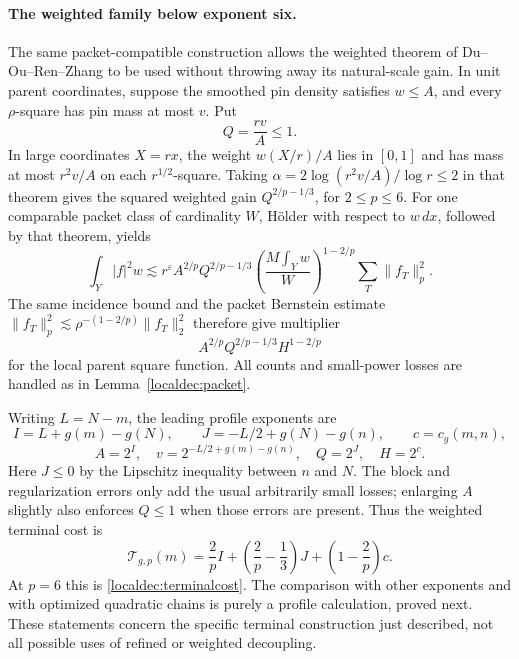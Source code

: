 \paragraph{The weighted family below exponent six.}
The same packet-compatible construction allows the weighted theorem of
Du--Ou--Ren--Zhang \cite[Theorem 1.1(b)]{dorz} to be used without
throwing away its natural-scale gain. In unit parent coordinates,
suppose the smoothed pin density satisfies \(w\le A\), and every
\(\rho\)-square has pin mass at most \(v\). Put
\[
 Q=\frac{rv}{A}\le1.
\]
In large coordinates \(X=rx\), the weight \(w(X/r)/A\) lies in
\([0,1]\) and has mass at most \(r^2v/A\) on each
\(r^{1/2}\)-square. Taking
\(\alpha=2\log(r^2v/A)/\log r\le2\) in that theorem gives the
squared weighted gain \(Q^{2/p-1/3}\), for \(2\le p\le6\).
For one comparable packet class of cardinality \(W\), H\"older with
respect to \(w\,dx\), followed by that theorem, yields
\[
 \int_Y|f|^2w
 \lesssim r^\varepsilon A^{2/p}Q^{2/p-1/3}
 \left(\frac{M\int_Yw}{W}\right)^{1-2/p}
 \sum_T\|f_T\|_p^2.
\]
The same incidence bound and the packet Bernstein estimate
\(\|f_T\|_p^2\lesssim\rho^{-(1-2/p)}\|f_T\|_2^2\)
therefore give multiplier
\begin{equation}\label{localdec:weightedmultiplier}
 A^{2/p}Q^{2/p-1/3}H^{1-2/p}
\end{equation}
for the local parent square function. All counts and small-power losses
are handled as in Lemma~\ref{localdec:packet}.

Writing \(L=N-m\), the leading profile exponents are
\[
 I=L+g(m)-g(N),\qquad
 J=-L/2+g(N)-g(n),\qquad c=c_g(m,n),
\]
\[
 A=2^I,\quad v=2^{-L/2+g(m)-g(n)},\quad Q=2^J,\quad H=2^c.
\]
Here \(J\le0\) by the Lipschitz inequality between \(n\) and \(N\).
The block and regularization errors only add the usual arbitrarily
small losses; enlarging \(A\) slightly also enforces \(Q\le1\)
when those errors are present. Thus the weighted terminal cost is
\begin{equation}\label{localdec:weightedcost}
 \mathcal T_{g,p}(m)=\frac2p I+
        \left(\frac2p-\frac13\right)J+
        \left(1-\frac2p\right)c.
\end{equation}
At \(p=6\) this is \eqref{localdec:terminalcost}. The comparison with
other exponents and with optimized quadratic chains is purely a
profile calculation, proved next. These statements concern the
specific terminal construction just described, not all possible uses
of refined or weighted decoupling.
